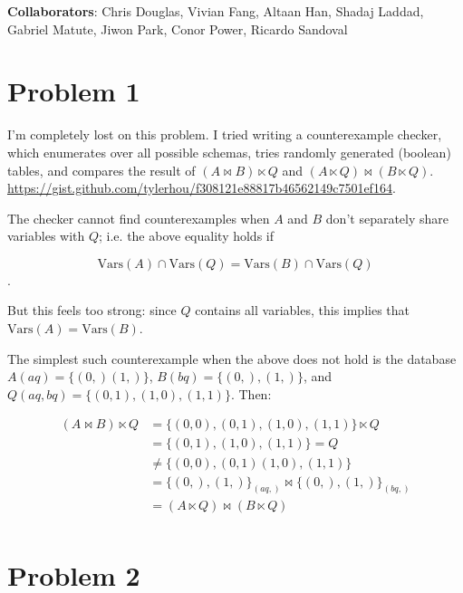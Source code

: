 \documentclass{article}
\title{\vspace{-2cm}\DocumentTitle{}}
\author{\Name{} (SID \StudentID{})}
\date{}
\begin{document}
\maketitle

\noindent\textbf{Collaborators}:
Chris Douglas,
Vivian Fang,
Altaan Han,
Shadaj Laddad,
Gabriel Matute,
Jiwon Park, \newline
Conor Power,
Ricardo Sandoval

\newcommand{\AND}{\wedge}
\newcommand{\OR}{\vee}
\newcommand{\Vars}{\text{Vars}}

\section{Problem 1}

I'm completely lost on this problem. I tried writing a counterexample checker,
which enumerates over all possible schemas, tries randomly generated (boolean)
tables, and compares the result of $(A \bowtie B) \ltimes Q$ and $(A \ltimes Q)
\bowtie (B \ltimes Q)$.
\url{https://gist.github.com/tylerhou/f308121e88817b46562149c7501ef164}.

The checker cannot find counterexamples when $A$ and $B$ don't separately share
variables with $Q$; i.e. the above equality holds if

$$\Vars(A) \cap \Vars(Q) = \Vars(B) \cap \Vars(Q)$$.

But this feels too strong: since $Q$ contains all variables, this implies that
$\Vars(A) = \Vars(B)$.

The simplest such counterexample when the above does not hold is the database
$A(aq) = \{(0,) (1,)\}$, $B(bq) = \{(0,), (1,)\}$, and $Q(aq, bq) = \{(0, 1),
(1, 0), (1, 1)\}$. Then:

\begin{align*}
    (A \bowtie B) \ltimes Q &= \{(0, 0), (0, 1), (1, 0), (1, 1)\} \ltimes Q           \\
                            &= \{(0, 1), (1, 0), (1, 1)\} = Q                         \\
                            &\neq \{(0, 0), (0, 1) (1, 0), (1, 1)\}                   \\
                            &= \{(0,), (1,)\}_{(aq,)} \bowtie \{(0,), (1,)\}_{(bq,)}  \\
                            &= (A \ltimes Q) \bowtie (B \ltimes Q)                    \\
\end{align*}

\section{Problem 2}
\end{document}
